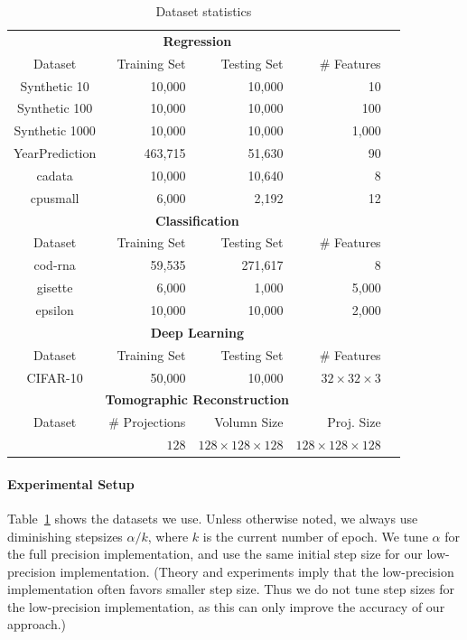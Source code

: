 \documentclass{article}
\begin{document}
\begin{table}[t]
\small
\centering
\begin{tabular}{crrrr}
\hline
\multicolumn{4}{c}{\bf Regression}\\
Dataset           & Training Set & Testing Set & \# Features  \\
\hline
Synthetic 10   & 10,000        & 10,000       & 10               \\
Synthetic 100  & 10,000        & 10,000       & 100              \\
Synthetic 1000 & 10,000        & 10,000       & 1,000           \\
YearPrediction & 463,715       & 51,630       & 90                  \\
cadata         & 10,000        & 10,640       & 8                   \\
cpusmall       & 6,000         & 2,192        & 12     \\
\hline
\hline
\multicolumn{4}{c}{\bf Classification}\\
Dataset           & Training Set & Testing Set & \# Features \\
\hline
cod-rna        & 59,535        & 271,617      & 8    \\
gisette        & 6,000         & 1,000        & 5,000  \\  
epsilon        & 10,000        & 10,000       & 2,000\\  
\hline
\hline
\multicolumn{4}{c}{\bf Deep Learning}\\
Dataset           & Training Set & Testing Set & \# Features \\
\hline
CIFAR-10        & 50,000        & 10,000      &$32\times 32\times 3$     \\
\hline
\hline
\multicolumn{4}{c}{\bf Tomographic Reconstruction}\\
Dataset           & \# Projections & Volumn Size & Proj. Size \\
\hline
                  & $128$            & $128\times 128\times 128$      & $128\times 128\times 128$     \\
\hline
\end{tabular}
\caption{Dataset statistics}
\label{table:dataset}
\end{table}

\paragraph{Experimental Setup} 
Table~\ref{table:dataset} shows the 
datasets we use. 
Unless otherwise noted, we always
use diminishing stepsizes $\alpha/k$,
where $k$ is the current number of
epoch. We tune 
$\alpha$ for the full precision
implementation, and use the
same initial step size for 
our low-precision 
implementation. (Theory and
experiments imply that the low-precision
implementation often favors smaller step size. 
Thus we do not tune step sizes for the low-precision 
implementation, as this can only improve the accuracy of our approach.) 
\end{document}
